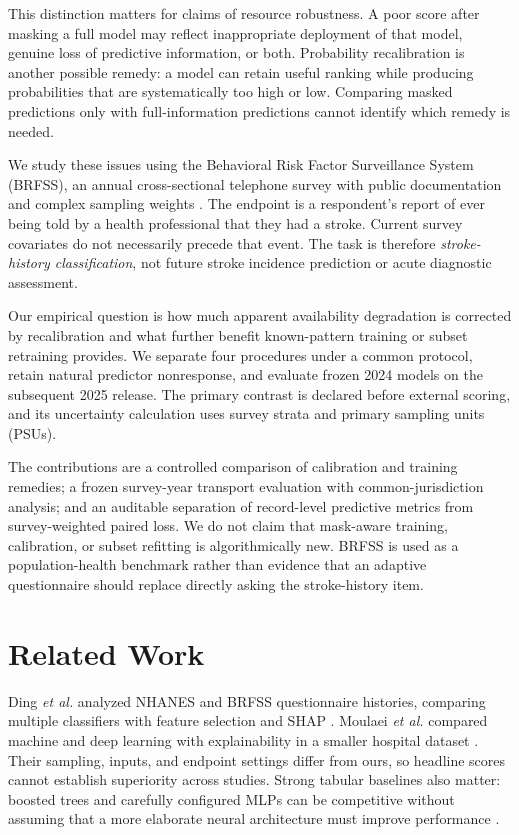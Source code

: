 \documentclass[conference,letterpaper]{IEEEtran}
\begin{document}
This distinction matters for claims of resource robustness. A poor score after masking a full model may reflect inappropriate deployment of that model, genuine loss of predictive information, or both. Probability recalibration is another possible remedy: a model can retain useful ranking while producing probabilities that are systematically too high or low. Comparing masked predictions only with full-information predictions cannot identify which remedy is needed.

We study these issues using the Behavioral Risk Factor Surveillance System (BRFSS), an annual cross-sectional telephone survey with public documentation and complex sampling weights \cite{cdc24,cdc25}. The endpoint is a respondent's report of ever being told by a health professional that they had a stroke. Current survey covariates do not necessarily precede that event. The task is therefore \emph{stroke-history classification}, not future stroke incidence prediction or acute diagnostic assessment.

Our empirical question is how much apparent availability degradation is corrected by recalibration and what further benefit known-pattern training or subset retraining provides. We separate four procedures under a common protocol, retain natural predictor nonresponse, and evaluate frozen 2024 models on the subsequent 2025 release. The primary contrast is declared before external scoring, and its uncertainty calculation uses survey strata and primary sampling units (PSUs).

The contributions are a controlled comparison of calibration and training remedies; a frozen survey-year transport evaluation with common-jurisdiction analysis; and an auditable separation of record-level predictive metrics from survey-weighted paired loss. We do not claim that mask-aware training, calibration, or subset refitting is algorithmically new. BRFSS is used as a population-health benchmark rather than evidence that an adaptive questionnaire should replace directly asking the stroke-history item.

\section{Related Work}
Ding \emph{et al.} analyzed NHANES and BRFSS questionnaire histories, comparing multiple classifiers with feature selection and SHAP \cite{ding}. Moulaei \emph{et al.} compared machine and deep learning with explainability in a smaller hospital dataset \cite{moulaei}. Their sampling, inputs, and endpoint settings differ from ours, so headline scores cannot establish superiority across studies. Strong tabular baselines also matter: boosted trees and carefully configured MLPs can be competitive without assuming that a more elaborate neural architecture must improve performance \cite{realmlp}.
\end{document}
